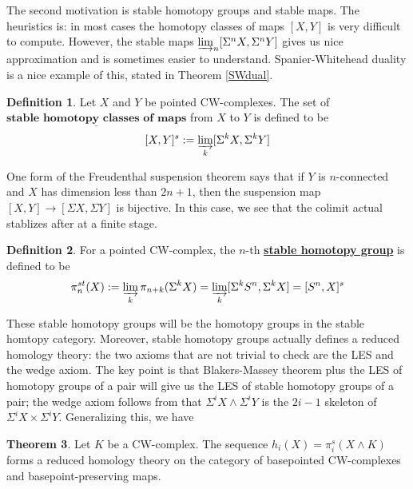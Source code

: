 \documentclass{article}
\theoremstyle{definition}
\newtheorem{theorem}{Theorem}[section] %
\newtheorem{definition}[theorem]{Definition}
\begin{document}
The second motivation is stable homotopy groups and stable maps. The heuristics is: in most cases the homotopy classes of maps $[X,Y]$ is very difficult to compute. However, the stable maps $\varinjlim_n[\Sigma^nX,\Sigma^n Y]$ gives us nice approximation and is sometimes easier to understand. Spanier-Whitehead duality is a nice example of this, stated in Theorem \ref{SWdual}.


\begin{tcolorbox}[colback=purple!5!white,colframe=purple!75!black]
\begin{definition}
Let $X$ and $Y$ be pointed CW-complexes. The set of $\underline{\textbf{stable homotopy classes of maps}}$ from $X$ to $Y$ is defined to be 
\[[X,Y]^s:= \varinjlim_{k}[\Sigma^k X, \Sigma^k Y] \]
\end{definition}
\end{tcolorbox}
One form of the Freudenthal suspension theorem says that if $Y$ is $n$-connected and $X$ has dimension less than $2n+1$, then the suspension map $[X,Y]\to [\Sigma X,\Sigma Y]$ is bijective. In this case, we see that the colimit actual stablizes after at a finite stage. 

\begin{tcolorbox}[colback=purple!5!white,colframe=purple!75!black]
\begin{definition}
For a pointed CW-complex, the $n$-th \underline{\textbf{stable homotopy group}} is defined to be 
\[\pi_n^{st}(X):=\varinjlim_{k}\pi_{n+k}(\Sigma^k X)=\varinjlim_{k}[\Sigma^k S^n, \Sigma^k X]=[S^n,X]^s\]
\end{definition}
\end{tcolorbox}
These stable homotopy groups will be the homotopy groups in the stable homtopy category. Moreover, stable homotopy groups actually defines a reduced homology theory: the two axioms that are not trivial to check are the LES and the wedge axiom. The key point is that Blakers-Massey theorem plus the LES of homotopy groups of a pair will give us the LES of stable homotopy groups of a pair; the wedge axiom follows from that $\Sigma^i X\wedge \Sigma^i Y$ is the $2i-1$ skeleton of  $\Sigma^i X\times \Sigma^i Y$. Generalizing this, we have 

\begin{tcolorbox}[colback=red!5!white,colframe=red!30!white]
\begin{theorem}
    Let $K$ be a CW-complex. The sequence $h_i(X) = \pi^s_i(X \wedge K)$ forms a reduced homology theory on the category of basepointed CW-complexes and basepoint-preserving maps.
\end{theorem}
\end{tcolorbox}
\end{document}
